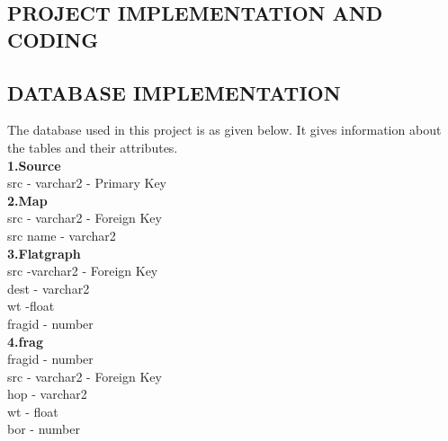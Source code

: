 \begin{center}

\justifying
\chapter{\large PROJECT IMPLEMENTATION AND CODING}
\justifying

\section{\normalsize DATABASE IMPLEMENTATION }
\hspace{1cm}The database used in this project is as given below. It gives information about the tables and their attributes.\\
\hspace*{0.7cm}\textbf{1.Source} 
\\ \hspace*{1cm}src - varchar2 - Primary Key \\

\vspace{0.2in}
\textbf{2.Map} 
\\\hspace*{1cm}src - varchar2 - Foreign Key \\
\hspace*{1cm}src name - varchar2 \\

\vspace{0.2in}
\textbf{3.Flatgraph}
\\ \hspace*{1cm}src -varchar2 - Foreign Key \\
\hspace*{1cm}dest - varchar2 \\
\hspace*{1cm}wt -float \\
\hspace*{1cm}fragid - number\\

\vspace{0.2in}
\textbf{4.frag} 
\\ \hspace*{1cm}fragid - number\\
\hspace*{1cm}src - varchar2 - Foreign Key \\
 \hspace*{1cm}hop - varchar2\\
\hspace*{1cm}wt - float  \\
\hspace*{1cm}bor - number\\


\end{center}
